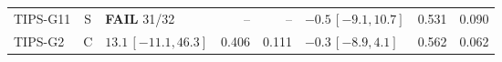 \begin{longtable}{lcp{37mm}rrp{37mm}rr}
TIPS-G11 & S & \textbf{FAIL} 31/32 & -- & -- & \(-0.5\,[-9.1,10.7]\) & 0.531 & 0.090\\
TIPS-G2 & C & \(13.1\,[-11.1,46.3]\) & 0.406 & 0.111 & \(-0.3\,[-8.9,4.1]\) & 0.562 & 0.062\\

\end{longtable}
